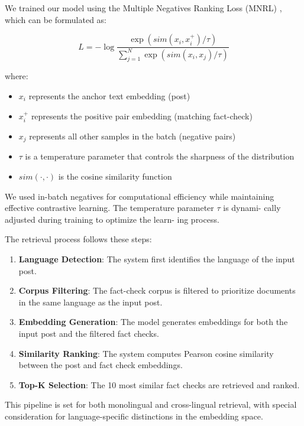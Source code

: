\documentclass[11pt]{article}
\begin{document}
We trained our model using the Multiple Negatives Ranking Loss (MNRL) \cite{jadwin2023improving}, which can be formulated as:

\begin{equation}
L = -\log \frac{\exp(sim(x_i, x_i^+)/\tau)}{\sum_{j=1}^{N} \exp(sim(x_i, x_j)/\tau)}
\end{equation}

where:
\begin{itemize}
    \item $x_i$ represents the anchor text embedding (post)
    \item $x_i^+$ represents the positive pair embedding (matching fact-check)
    \item $x_j$ represents all other samples in the batch (negative pairs)
    \item $\tau$ is a temperature parameter that controls the sharpness of the distribution
    \item $sim(\cdot,\cdot)$ is the cosine similarity function 
\end{itemize}

We used in-batch negatives for computational
efficiency while maintaining effective contrastive
learning. The temperature parameter $\tau$ is dynami-
cally adjusted during training to optimize the learn-
ing process.


The retrieval process follows these steps:
\begin{enumerate}
    \item \textbf{Language Detection}: The system first identifies the language of the input post.
    \item \textbf{Corpus Filtering}: The fact-check corpus is filtered to prioritize documents in the same language as the input post.
    \item \textbf{Embedding Generation}: The model generates embeddings for both the input post and the filtered fact checks.
    \item \textbf{Similarity Ranking}: The system computes Pearson cosine similarity between the post and fact check embeddings.
    \item \textbf{Top-K Selection}: The 10 most similar fact checks are retrieved and ranked.
\end{enumerate}

This pipeline is set for both monolingual and cross-lingual retrieval, with special consideration for language-specific distinctions in the embedding space.
\end{document}
